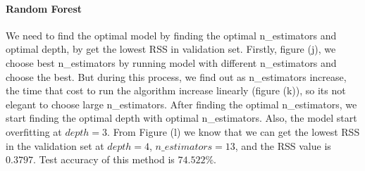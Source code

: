 \documentclass{article}
\begin{document}
\paragraph{Random Forest}
We need to find the optimal model by finding the optimal n\_estimators and optimal depth, by get the lowest RSS in validation set. Firstly, figure (j), we choose best n\_estimators by running model with different n\_estimators and choose the best. But during this process, we find out as n\_estimators increase, the time that cost to run the algorithm increase linearly (figure (k)), so its not elegant to choose large n\_estimators. After finding the optimal n\_estimators, we start finding the optimal depth with optimal n\_estimators. Also, the model start overfitting at $depth = 3$. From Figure (l) we know that we can get the lowest RSS in the validation set at $depth = 4$, $n\_estimators = 13$, and the RSS value is $0.3797$. Test accuracy of this method is $74.522\%$.
\begin{figure}[htbp]
\centering
{}%
%
%
\centering
\end{figure}
\end{document}
